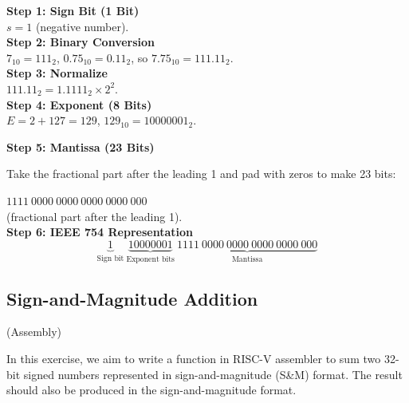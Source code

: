 \begin{minipage}[t]{0.45\textwidth}
\vspace*{5px}
\textbf{Step 1: Sign Bit (1 Bit)}\\  
\vspace*{5px}
\( s = 1 \) (negative number). \\
\vspace*{5px} 
\textbf{Step 2: Binary Conversion}\\  
\vspace*{5px}
\( 7_{10} = 111_2 \), \( 0.75_{10} = 0.11_2 \), so \( 7.75_{10} = 111.11_2 \). \\
\textbf{Step 3: Normalize}\\
\vspace*{5px}  
\( 111.11_2 = 1.1111_2 \times 2^2 \). \\
\vspace*{5px}
\textbf{Step 4: Exponent (8 Bits)}\\
\vspace*{5px}  
\( E = 2 + 127 = 129 \), \( 129_{10} = 10000001_2 \).
\end{minipage}
\hfill
\vline
\hfill
\begin{minipage}[t]{0.45\textwidth}

\textbf{Step 5: Mantissa (23 Bits)}\\
\vspace*{3px}  
\begin{justify}
    Take the fractional part after the leading 1 and pad with zeros to make 23 bits:
\end{justify} 
\( 1111 \ 0000 \ 0000 \ 0000 \ 0000 \ 000 \) \\
(fractional part after the leading 1). \\
\vspace*{3px}
\textbf{Step 6: IEEE 754 Representation}\\
\vspace*{3px}  
\[
\boxed{
  \underbrace{1}_{\text{Sign bit}} \ 
  \underbrace{10000001}_{\text{Exponent bits}} \ 
  \underbrace{1111 \ 0000 \ 0000 \ 0000 \ 0000 \ 000}_{\text{Mantissa}}
}
\]
\end{minipage}

\subsection{Sign-and-Magnitude Addition} (Assembly)

In this exercise, we aim to write a function in RISC-V assembler to sum two 32-bit signed numbers represented in sign-and-magnitude (S\&M) format. The result should also be produced in the sign-and-magnitude format.

